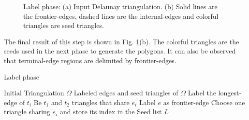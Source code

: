 \documentclass[lineno,pdflatex,sn-mathphys]{sn-jnl}%
\theoremstyle{thmstyleone}%
\theoremstyle{thmstyletwo}%
\theoremstyle{thmstylethree}%
\begin{document}
\begin{figure}[h]
\centering     %
{} \hspace{0.5cm} 
\caption{Label phase: (a) Input Delaunay triangulation. (b) Solid lines are the frontier-edges, dashed lines are the internal-edges and colorful triangles are seed triangles. }
\label{figs:label_phase} 
\end{figure}

The final result of this step is shown in Fig. \ref{figs:label_phase}(b). The colorful triangles are the seeds used in the next phase to generate the polygons. It can also be  observed that terminal-edge regions are  delimited by frontier-edges. 

\begin{algorithm}
    \caption{Label phase}\label{algo:labelphase}
    \begin{algorithmic}[1]
    \Require Initial Triangulation $\Omega$
    \Ensure Labeled edges and seed triangles of $\Omega$ 
     \label{algolabel:TriangleIteration}
        \State Label the longest-edge of $t_i$
    \EndFor
     \label{algolabel:Edgeiteration}
        \State Be $t_1$ and $t_2$ triangles that share $e_i$
         \label{algolabel:label}
            \State Label $e$ as frontier-edge
        \EndIf    
         \label{algolabel:seedtrianglelabel}
            \State Choose one triangle sharing $e_i$ and store its index in the Seed list $L$
        \EndIf    
    \EndFor
    \end{algorithmic}
\end{algorithm}
\end{document}
